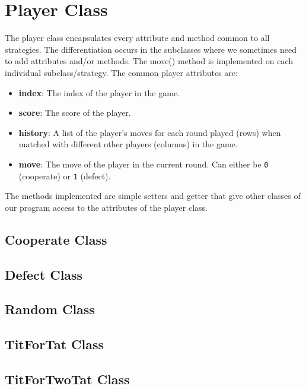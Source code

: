 \section{Player Class}
The player class encapsulates every attribute and method common to all strategies. The differentiation occurs in the subclasses where we sometimes need to add attributes and/or methods. The move() method is implemented on each individual subclass/strategy. The common player attributes are:
\begin{itemize}
    \item \textbf{index}: The index of the player in the game.
    \item \textbf{score}: The score of the player.
    \item \textbf{history}: A list of the player's moves for each round played (rows) when matched with different other players (columns) in the game.
    \item \textbf{move}: The move of the player in the current round. Can either be \texttt{0} (cooperate) or \texttt{1} (defect).
\end{itemize}
The methods implemented are simple setters and getter that give other classes of our program access to the attributes of the player class.

\subsection{Cooperate Class}

\subsection{Defect Class}

\subsection{Random Class}

\subsection{TitForTat Class}

\subsection{TitForTwoTat Class}

